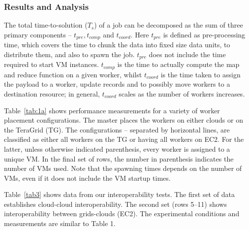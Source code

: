 \documentclass[graybox]{svmult}
\begin{document}
\subsubsection*{Results and Analysis}

The total time-to-solution ($T_s$) of a \sagamapreduce job can be
decomposed as the sum of three primary components -- $t_{pre},
t_{comp}$ and $t_{coord}$.  Here $t_{pre}$ is defined as
pre-processing time, which covers the time to chunk the data into
fixed size data units, to distribute them, and also to spawn the job.
$t_{pre}$ does not include the time required to start VM instances.
$t_{comp}$ is the time to actually compute the map and reduce function
on a given worker, whilst $t_{coord}$ is the time taken to assign the
payload to a worker, update records and to possibly move workers to a
destination resource; in general, $t_{coord}$ scales as the number of
workers increases.

Table~\ref{tab:1a} shows performance measurements for a variety of
worker placement configurations.  The master places the workers on
either clouds or on the TeraGrid (TG). The configurations -- separated
by horizontal lines, are classified as either all workers on the TG or
having all workers on EC2. For the latter, unless otherwise indicated
parenthesis, every worker is assigned to a unique VM. In the final set
of rows, the number in parenthesis indicates the number of VMs used.
Note that the spawning times depends on the number of VMs, even if it
does not include the VM startup times.  


Table~\ref{tab3} shows data from our interoperability tests.  The
first set of data establishes cloud-cloud interoperability. The second
set (rows 5--11) shows interoperability between grids-clouds (EC2).
The experimental conditions and measurements are similar to Table 1.
\end{document}
